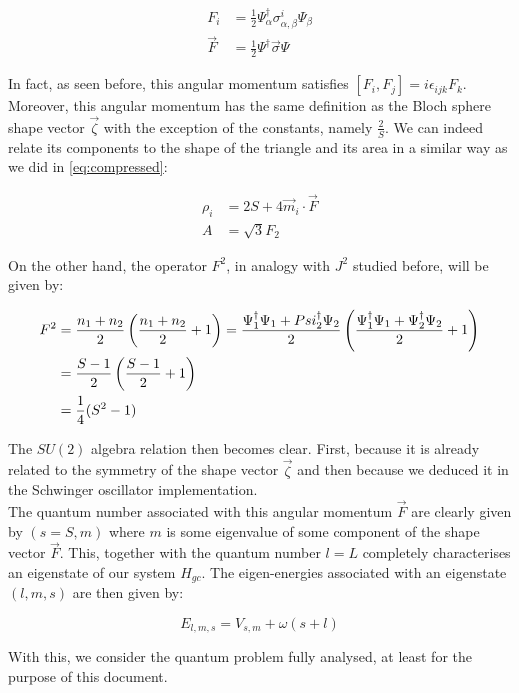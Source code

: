 \begin{align*}
F_i  &= \frac{1}{2}\Psi_\alpha^\dagger \sigma^i_{\alpha,\beta}\Psi_\beta\\
\vec{F} &= \frac{1}{2}\Psi^\dagger \vec{\sigma}\Psi
\end{align*}

In fact, as seen before, this angular momentum satisfies $[F_i,F_j] = i\epsilon_{ijk}F_k$. Moreover, this angular momentum has the same definition as the Bloch sphere shape vector $\vec{\zeta}$ with the exception of the constants, namely $\frac{2}{S}$. We can indeed relate its components to the shape of the triangle and its area in a similar way as we did in \eqref{eq:compressed}:

\begin{align*}
\rho_i &= 2S+4\vec{m}_i\cdot\vec{F}\\
A &= \sqrt{3}F_2
\end{align*}

On the other hand, the operator $F^2$, in analogy with $J^2$ studied before, will be given by: 

\begin{align*}
F^2 &= \frac{n_1+n_2}{2}\left( \frac{n_1+n_2}{2}+1 \right) = \frac{\Psi_1^\dagger \Psi_1 + Psi_2^\dagger \Psi_2}{2}\left( \frac{\Psi_1^\dagger \Psi_1 + \Psi_2^\dagger \Psi_2}{2}+1 \right)\\
&= \frac{S-1}{2}\left( \frac{S-1}{2}+1 \right)\\
&= \frac{1}{4}(S^2-1)
\end{align*}

The $SU(2)$ algebra relation then becomes clear. First, because it is already related to the symmetry of the shape vector $\vec{\zeta}$ and then because we deduced it in the Schwinger oscillator implementation.\\

The quantum number associated with this angular momentum $\vec{F}$ are clearly given by $(s= S,m)$ where $m$ is some eigenvalue of some component of the shape vector $\vec{F}$. This, together with the quantum number $l=L$ completely characterises an eigenstate of our system $H_{gc}$. The eigen-energies associated with an eigenstate $(l,m,s)$ are then given by:

\begin{equation*}
E_{l,m,s} = V_{s,m} + \omega(s+l)
\end{equation*}

With this, we consider the quantum problem fully analysed, at least for the purpose of this document.
















